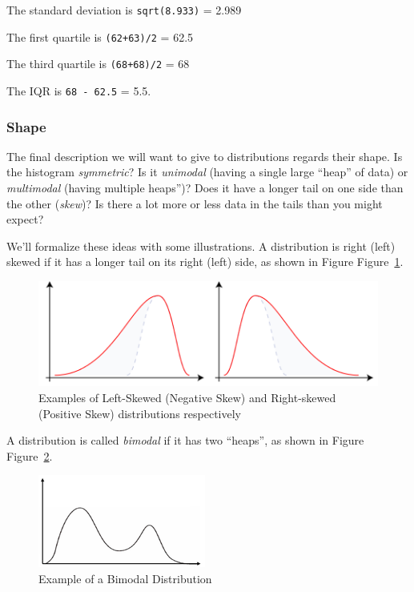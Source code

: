 \documentclass[
  letterpaper,
  DIV=11,
  numbers=noendperiod]{scrreprt}
\begin{document}
The standard deviation is \texttt{sqrt(8.933)} = 2.989

The first quartile is \texttt{(62+63)/2} = 62.5

The third quartile is \texttt{(68+68)/2} = 68

The IQR is \texttt{68\ -\ 62.5} = 5.5.

\hypertarget{shape}{%
\subsubsection*{Shape}\label{shape}}

The final description we will want to give to distributions regards
their shape. Is the histogram \emph{symmetric}? Is it \emph{unimodal}
(having a single large ``heap'' of data) or \emph{multimodal} (having
multiple heaps'')? Does it have a longer tail on one side than the other
(\emph{skew})? Is there a lot more or less data in the tails than you
might expect?

We'll formalize these ideas with some illustrations. A distribution is
right (left) skewed if it has a longer tail on its right (left) side, as
shown in Figure Figure~\ref{fig-skewdiagram}.

\begin{figure}

{\centering \includegraphics{./img/skewdiagrams.png}

}

\caption{\label{fig-skewdiagram}Examples of Left-Skewed (Negative Skew)
and Right-skewed (Positive Skew) distributions respectively}

\end{figure}

A distribution is called \emph{bimodal} if it has two ``heaps'', as
shown in Figure Figure~\ref{fig-bimodal}.

\begin{figure}

{\centering \includegraphics{./img/bimodal.png}

}

\caption{\label{fig-bimodal}Example of a Bimodal Distribution}

\end{figure}
\end{document}
